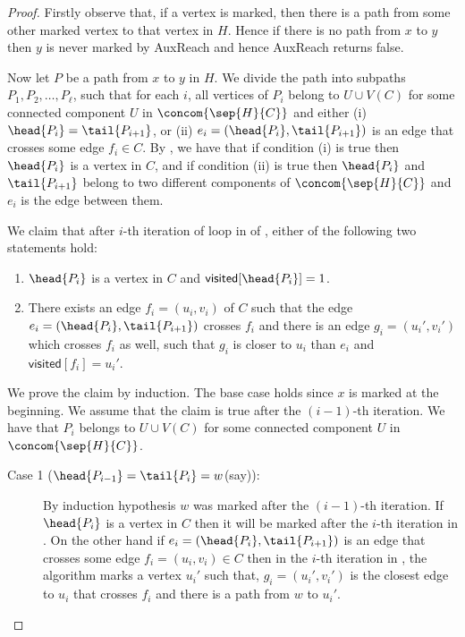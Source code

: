\documentclass{toc}
\begin{document}
\begin{proof}
Firstly observe that, if a vertex is marked, then there is a path from some other marked vertex to that vertex in $H$. Hence if there is no path from $x$ to $y$ then $y$ is never marked by \textsf{AuxReach} and hence \textsf{AuxReach} returns \textsf{false}.

Now let $P$ be a path from $x$ to $y$ in $H$. We divide the path into subpaths $P_1, P_2 , \ldots , P_{\ell}$, such that for each $i$, all vertices of $P_i$ belong to $U \cup V(C)$ for some connected component $U$ in $\concom{\sep{H}{C}}$ and either (i) $\head{P_i} = \tail{P_{i+1}}$, or (ii) $e_i = (\head{P_i} , \tail{P_{i+1}})$ is an edge that crosses some edge $f_i \in C$. By , we have that if condition (i) is true then $\head{P_i}$ is a vertex in $C$, and if condition (ii) is true then $\head{P_i}$ and $\tail{P_{i+1}}$ belong to two different components of $\concom{\sep{H}{C}}$ and $e_i$ is the edge between them.

We claim that after $i$-th iteration of loop in  of , either of the following two statements hold:
\begin{enumerate}
\item $\head{P_i}$ is a vertex in $C$ and $\textsf{visited}[\head{P_i}] = 1$.
\item There exists an edge $f_i = (u_i, v_i)$ of $C$ such that the edge $e_i = (\head{P_i}, \tail{P_{i+1}})$ crosses $f_i$ and there is an edge $g_i = (u_i',v_i')$ which crosses $f_i$ as well, such that $g_i$ is closer to $u_i$ than $e_i$ and $\textsf{visited}[f_i] = u_i'$.
\end{enumerate}
We prove the claim by induction. The base case holds since $x$ is marked at the beginning. We assume that the claim is true after the $(i-1)$-th iteration. We have that $P_i$ belongs to $U \cup V(C)$ for some connected component $U$ in $\concom{\sep{H}{C}}$.
\begin{description}
\item[Case 1 ($\head{P_{i-1}} = \tail{P_{i}} = w$(say)):] By induction hypothesis $w$ was marked after the $(i-1)$-th iteration. If $\head{P_i}$ is a vertex in $C$ then it will be marked after the $i$-th iteration in . On the other hand if $e_i = (\head{P_i} , \tail{P_{i+1}})$ is an edge that crosses some edge $f_i = (u_i,v_i) \in C$ then in the $i$-th iteration in , the algorithm marks a vertex $u_i'$ such that, $g_i = (u_i',v_i')$ is the closest edge to $u_i$ that crosses $f_i$ and there is a path from $w$ to $u_i'$.


\end{description}
\end{proof}
\end{document}
